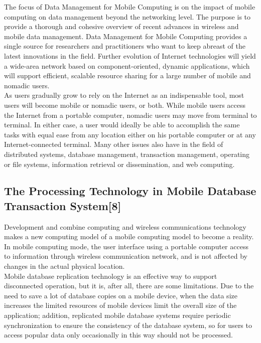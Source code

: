 \documentclass[12pt, a4paper]{article}
\begin{document}
\hspace{5mm}The focus of Data Management for Mobile Computing is on the impact of mobile computing on data management beyond the networking level. The purpose is to provide a thorough and cohesive overview of recent advances in wireless and mobile data management. Data Management for Mobile Computing provides a single source for researchers and practitioners who want to keep abreast of the latest innovations in the field. Further evolution of Internet technologies will yield a wide-area network based on component-oriented, dynamic applications, which will support efficient, scalable resource sharing for a large number of mobile and nomadic users.\\

\hspace{5mm}As users gradually grow to rely on the Internet as an indispensable tool, most users will become mobile or nomadic users, or both. While mobile users access the Internet from a portable computer, nomadic users may move from terminal to terminal. In either case, a user would ideally be able to accomplish the same tasks with equal ease from any location either on his portable computer or at any Internet-connected terminal. Many other issues also have in the field of distributed systems, database management, transaction management, operating or file systems, information retrieval or dissemination, and web computing.
  
  \vspace{5mm}
\subsection{The Processing Technology in Mobile Database Transaction System[8]}

\vspace{5mm}
Development and combine computing and wireless communications technology makes a new computing model of a mobile computing model to become a reality. In mobile computing mode, the user interface using a portable computer access to information through wireless communication network, and is not affected by changes in the actual physical location.
\\

\hspace{5mm}Mobile database replication technology is an effective way to support disconnected operation, but it is, after all, there are some limitations. Due to the need to save a lot of database copies on a mobile device, when the data size increases the limited resources of mobile devices limit the overall size of the application; addition, replicated mobile database systems require periodic synchronization to ensure the consistency of the database system, so for users to access popular data only occasionally in this way should not be processed.
\\
\end{document}
